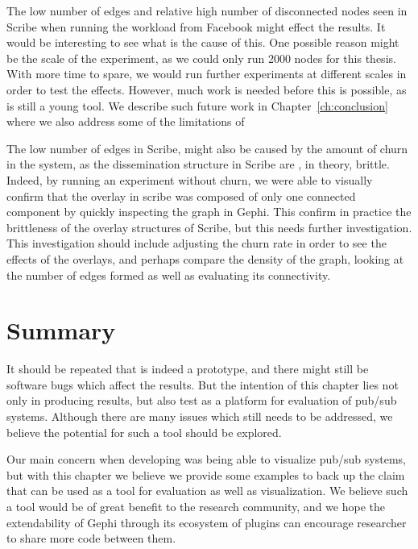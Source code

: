The low number of edges and relative high number of
disconnected nodes seen in Scribe when running the workload from
Facebook might effect the results. It would be interesting to see what
is the cause of this. One possible reason might be the scale of the
experiment, as we could only run 2000 nodes for this thesis. With more
time to spare, we would run further experiments at different scales in
order to test the effects. However, much work is needed before this is
possible, as \demo{} is still a young tool. We describe such future work
in Chapter~\ref{ch:conclusion} where we also address some of the
limitations of \demo{}

The low number of edges in Scribe, might also be caused by the amount of
churn in the system, as the dissemination structure in Scribe are , in
theory, brittle. Indeed, by running an experiment without churn, we were
able to visually confirm that the overlay in scribe was composed of only
one connected component by quickly inspecting the graph in Gephi. This
confirm in practice the brittleness of the overlay structures of Scribe,
but this needs further investigation. This investigation should include
adjusting the churn rate in order to see the effects of the overlays,
and perhaps compare the density of the graph, looking at the number of
edges formed as well as evaluating its connectivity.

\section{Summary}

It should be repeated that \demo{} is indeed a prototype, and there
might still be software bugs which affect the results. But the intention
of this chapter lies not only in producing results, but also test
\demo{} as a platform for evaluation of pub/sub systems. Although there
are many issues which still needs to be addressed, we believe the
potential for such a tool should be explored.

Our main concern when developing \demo{} was being able to visualize
pub/sub systems, but with this chapter we believe we provide some
examples to back up the claim that \demo{} can be used as a tool for
evaluation as well as visualization. We believe such a tool would be of
great benefit to the research community, and we hope the extendability
of Gephi through its ecosystem of plugins can encourage researcher to share
more code between them.


